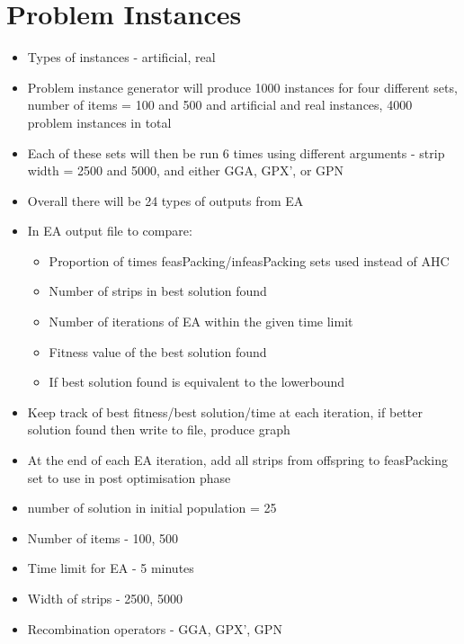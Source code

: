 \documentclass{elsarticle}
\begin{document}
\section{Problem Instances}
\begin{itemize}
	\item Types of instances - artificial, real
	\item Problem instance generator will produce 1000 instances for four different sets, number of items = 100 and 500 and artificial and real instances, 4000 problem instances in total
	\item Each of these sets will then be run 6 times using different arguments - strip width = 2500 and 5000, and either GGA, GPX', or GPN
	\item Overall there will be 24 types of outputs from EA
	\item In EA output file to compare:
	\begin{itemize}
		\item Proportion of times feasPacking/infeasPacking sets used instead of AHC
		\item Number of strips in best solution found
		\item Number of iterations of EA within the given time limit
		\item Fitness value of the best solution found
		\item If best solution found is equivalent to the lowerbound
	\end{itemize}
	\item Keep track of best fitness/best solution/time at each iteration, if better solution found then write to file, produce graph
\item At the end of each EA iteration, add all strips from offspring to feasPacking set to use in post optimisation phase
\item number of solution in initial population = 25
\item Number of items - 100, 500
\item Time limit for EA - 5 minutes
\item Width of strips - 2500, 5000
\item Recombination operators - GGA, GPX', GPN
\end{itemize}
\end{document}
